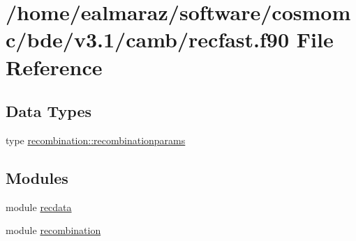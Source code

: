 \hypertarget{recfast_8f90}{}\section{/home/ealmaraz/software/cosmomc/bde/v3.1/camb/recfast.f90 File Reference}
\label{recfast_8f90}
\subsection*{Data Types}
\begin{DoxyCompactItemize}
\item 
type \mbox{\hyperlink{structrecombination_1_1recombinationparams}{recombination\+::recombinationparams}}
\end{DoxyCompactItemize}
\subsection*{Modules}
\begin{DoxyCompactItemize}
\item 
module \mbox{\hyperlink{namespacerecdata}{recdata}}
\item 
module \mbox{\hyperlink{namespacerecombination}{recombination}}
\end{DoxyCompactItemize}
